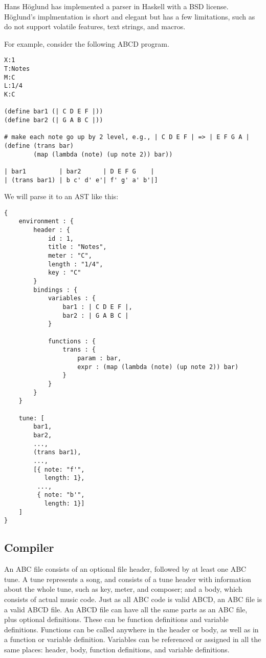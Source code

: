 Hans H\"{o}glund has implemented a parser in Haskell\cite{Hoglund15} with a BSD license. H\"{o}glund's implmentation is short and elegant but has a few limitations, such as do not support volatile features, text strings, and macros.

For example, consider the following ABCD program.
\begin{verbatim}
X:1
T:Notes
M:C
L:1/4
K:C

(define bar1 (| C D E F |))
(define bar2 (| G A B C |))

# make each note go up by 2 level, e.g., | C D E F | => | E F G A |
(define (trans bar)
        (map (lambda (note) (up note 2)) bar))

| bar1         | bar2      | D E F G    |
| (trans bar1) | b c' d' e'| f' g' a' b'|]
\end{verbatim}

We will parse it to an AST like this:
\begin{verbatim}
{
    environment : {
        header : {
            id : 1,
            title : "Notes",
            meter : "C",
            length : "1/4",
            key : "C"
        }
        bindings : {
            variables : {
                bar1 : | C D E F |,
                bar2 : | G A B C |
            }

            functions : {
                trans : {
                    param : bar,
                    expr : (map (lambda (note) (up note 2)) bar)
                }
            }
        }
    }

    tune: [
        bar1,
        bar2,
        ...,
        (trans bar1),
        ...,
        [{ note: "f'",
           length: 1},
         ...,
         { note: "b'",
           length: 1}]
    ]
}
\end{verbatim}

\subsection{Compiler}
An ABC file consists of an optional file header, followed by at least one ABC tune. A tune represents a song, and consists of a tune header with information about the whole tune, such as key, meter, and composer; and a body, which consists of actual music code\cite{Walshaw11}. Just as all ABC code is valid ABCD, an ABC file is a valid ABCD file. An ABCD file can have all the same parts as an ABC file, plus optional definitions. These can be function definitions and variable definitions. Functions can be called anywhere in the header or body, as well as in a function or variable definition. Variables can be referenced or assigned in all the same places: header, body, function definitions, and variable definitions.
    
